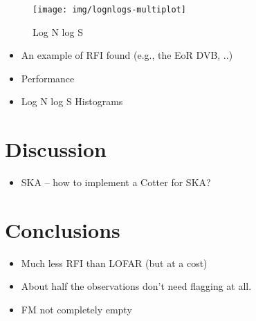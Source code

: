 \documentclass{pasa}
\begin{document}

\noindent\begin{figure}
\begin{center}\hspace*{-0.2cm}\texttt{[image: img/lognlogs-multiplot]}
\caption{Log N log S}
\label{fig:lognlogs}
\end{center}
\end{figure}

\begin{itemize}
 \item An example of RFI found (e.g., the EoR DVB, ..)
 \item Performance
 \item Log N log S Histograms
\end{itemize}

\section{Discussion}
\begin{itemize}
 \item SKA -- how to implement a Cotter for SKA?
\end{itemize}

\section{Conclusions}
\begin{itemize}
 \item Much less RFI than LOFAR (but at a cost)
 \item About half the observations don't need flagging at all. 
 \item FM not completely empty
\end{itemize}
\end{document}
